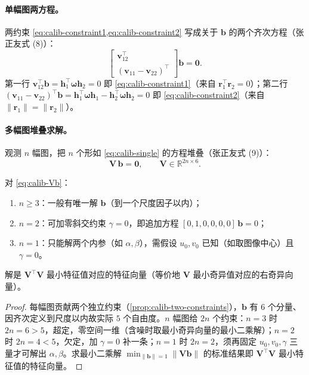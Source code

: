 \paragraph{单幅图两方程。}
两约束 \cref{eq:calib-constraint1,eq:calib-constraint2} 写成关于 $\mathbf{b}$ 的两个齐次方程（张正友式 (8)\cite{zhang2000calibration}）：
\begin{equation}
  \begin{bmatrix} \mathbf{v}_{12}^\top\\ (\mathbf{v}_{11}-\mathbf{v}_{22})^\top\end{bmatrix} \mathbf{b}=\mathbf{0}.
  \label{eq:calib-single}
\end{equation}
第一行 $\mathbf{v}_{12}^\top\mathbf{b}=\mathbf{h}_1^\top\boldsymbol{\omega}\mathbf{h}_2=0$ 即 \cref{eq:calib-constraint1}（来自 $\mathbf{r}_1^\top\mathbf{r}_2=0$）；第二行 $(\mathbf{v}_{11}-\mathbf{v}_{22})^\top\mathbf{b}=\mathbf{h}_1^\top\boldsymbol{\omega}\mathbf{h}_1-\mathbf{h}_2^\top\boldsymbol{\omega}\mathbf{h}_2=0$ 即 \cref{eq:calib-constraint2}（来自 $\|\mathbf{r}_1\|=\|\mathbf{r}_2\|$）。

\paragraph{多幅图堆叠求解。}
观测 $n$ 幅图，把 $n$ 个形如 \cref{eq:calib-single} 的方程堆叠（张正友式 (9)\cite{zhang2000calibration}）：
\begin{equation}
  \mathbf{V}\,\mathbf{b}=\mathbf{0},\qquad \mathbf{V}\in\mathbb{R}^{2n\times6}.
  \label{eq:calib-Vb}
\end{equation}

\begin{proposition}[$\mathbf{V}\mathbf{b}=\mathbf{0}$ 的可解性]\label{prop:calib-solvability}
对 \cref{eq:calib-Vb}：
\begin{enumerate}
  \item $n\ge3$：一般有唯一解 $\mathbf{b}$（到一个尺度因子以内）；
  \item $n=2$：可加零斜交约束 $\gamma=0$，即追加方程 $[0,1,0,0,0,0]\,\mathbf{b}=0$；
  \item $n=1$：只能解两个内参（如 $\alpha,\beta$），需假设 $u_0,v_0$ 已知（如取图像中心）且 $\gamma=0$。
\end{enumerate}
解是 $\mathbf{V}^\top\mathbf{V}$ 最小特征值对应的特征向量（等价地 $\mathbf{V}$ 最小奇异值对应的右奇异向量）。
\end{proposition}
\begin{proof}
每幅图贡献两个独立约束（\cref{prop:calib-two-constraints}），$\mathbf{b}$ 有 $6$ 个分量、因齐次定义到尺度以内故实际 $5$ 个自由度。$n$ 幅图给 $2n$ 个约束：$n=3$ 时 $2n=6>5$，超定，零空间一维（含噪时取最小奇异向量的最小二乘解）；$n=2$ 时 $2n=4<5$，欠定，加 $\gamma=0$ 补一条；$n=1$ 时 $2n=2$，须再固定 $u_0,v_0,\gamma$ 三量才可解出 $\alpha,\beta$。求最小二乘解 $\min_{\|\mathbf{b}\|=1}\|\mathbf{V}\mathbf{b}\|$ 的标准结果即 $\mathbf{V}^\top\mathbf{V}$ 最小特征值的特征向量。
\end{proof}

